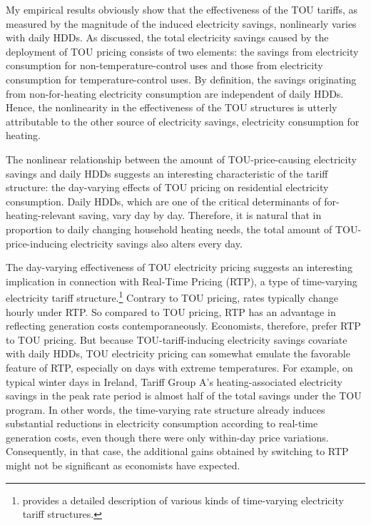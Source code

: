 My empirical results obviously show that the effectiveness of the TOU tariffs, as measured by the magnitude of the induced electricity savings, nonlinearly varies with daily HDDs. As discussed, the total electricity savings caused by the deployment of TOU pricing consists of two elements: the savings from electricity consumption for non-temperature-control uses and those from electricity consumption for temperature-control uses. By definition, the savings originating from non-for-heating electricity consumption are independent of daily HDDs. Hence, the nonlinearity in the effectiveness of the TOU structures is utterly attributable to the other source of electricity savings, electricity consumption for heating. 

The nonlinear relationship between the amount of TOU-price-causing electricity savings and daily HDDs suggests an interesting characteristic of the tariff structure: the day-varying effects of TOU pricing on residential electricity consumption. Daily HDDs, which are one of the critical determinants of for-heating-relevant saving, vary day by day. Therefore, it is natural that in proportion to daily changing household heating needs, the total amount of TOU-price-inducing electricity savings also alters every day. 

The day-varying effectiveness of TOU electricity pricing suggests an interesting implication in connection with Real-Time Pricing (RTP), a type of time-varying electricity tariff structure.\footnote{\cite{Household-Responses-to-Time-Varying-Electricity-Prices_Harding-and-Sexton_2017} provides a detailed description of various kinds of time-varying electricity tariff structures.} Contrary to TOU pricing, rates typically change hourly under RTP. So compared to TOU pricing, RTP has an advantage in reflecting generation costs contemporaneously. Economists, therefore, prefer RTP to TOU pricing. But because TOU-tariff-inducing electricity savings covariate with daily HDDs, TOU electricity pricing can somewhat emulate the favorable feature of RTP, especially on days with extreme temperatures. For example, on typical winter days in Ireland, Tariff Group A's heating-associated electricity savings in the peak rate period is almost half of the total savings under the TOU program. In other words, the time-varying rate structure already induces substantial reductions in electricity consumption according to real-time generation costs, even though there were only within-day price variations. Consequently, in that case, the additional gains obtained by switching to RTP might not be significant as economists have expected. 

